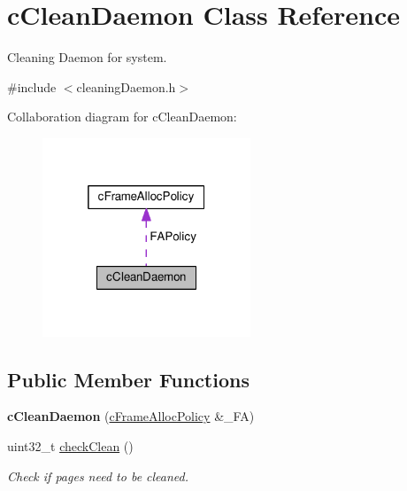 \hypertarget{classcCleanDaemon}{\section{c\-Clean\-Daemon \-Class \-Reference}
\label{d3/d6f/classcCleanDaemon}
}


\-Cleaning \-Daemon for system.  




{\ttfamily \#include $<$cleaning\-Daemon.\-h$>$}



\-Collaboration diagram for c\-Clean\-Daemon\-:\nopagebreak
\begin{figure}[H]
\begin{center}
\leavevmode
\includegraphics[width=176pt]{d7/def/classcCleanDaemon__coll__graph}
\end{center}
\end{figure}
\subsection*{\-Public \-Member \-Functions}
\begin{DoxyCompactItemize}
\item 
\hypertarget{classcCleanDaemon_a7646bbaebfefa0c9478e5a23333768db}{{\bfseries c\-Clean\-Daemon} (\hyperlink{classcFrameAllocPolicy}{c\-Frame\-Alloc\-Policy} \&\-\_\-\-F\-A)}\label{d3/d6f/classcCleanDaemon_a7646bbaebfefa0c9478e5a23333768db}

\item 
uint32\-\_\-t \hyperlink{classcCleanDaemon_ac9a8ca1ac1d35f554af393274dd87f68}{check\-Clean} ()
\begin{DoxyCompactList}\small\item\em \-Check if pages need to be cleaned. \end{DoxyCompactList}\end{DoxyCompactItemize}
